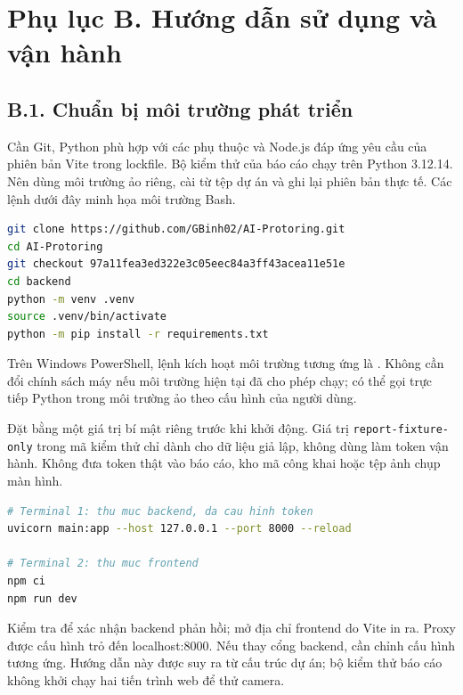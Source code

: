 \chapter*{Phụ lục B. Hướng dẫn sử dụng và vận hành}
\setcounter{table}{0}
\renewcommand{\theHtable}{appendixB.\arabic{table}}
\setcounter{lstlisting}{0}
\section*{B.1. Chuẩn bị môi trường phát triển}
Cần Git, Python phù hợp với các phụ thuộc và Node.js đáp ứng yêu cầu của phiên bản Vite trong lockfile. Bộ kiểm thử của báo cáo chạy trên Python 3.12.14. Nên dùng môi trường ảo riêng, cài từ tệp dự án và ghi lại phiên bản thực tế. Các lệnh dưới đây minh họa môi trường Bash.

\begin{lstlisting}[language=bash,caption={Lấy đúng phiên bản mã khảo sát}]
git clone https://github.com/GBinh02/AI-Protoring.git
cd AI-Protoring
git checkout 97a11fea3ed322e3c05eec84a3ff43acea11e51e
cd backend
python -m venv .venv
source .venv/bin/activate
python -m pip install -r requirements.txt
\end{lstlisting}
Trên Windows PowerShell, lệnh kích hoạt môi trường tương ứng là . Không cần đổi chính sách máy nếu môi trường hiện tại đã cho phép chạy; có thể gọi trực tiếp Python trong môi trường ảo theo cấu hình của người dùng.

Đặt  bằng một giá trị bí mật riêng trước khi khởi động. Giá trị \texttt{report-fixture-only} trong mã kiểm thử chỉ dành cho dữ liệu giả lập, không dùng làm token vận hành. Không đưa token thật vào báo cáo, kho mã công khai hoặc tệp ảnh chụp màn hình.

\begin{lstlisting}[language=bash,caption={Chạy backend và frontend trong hai terminal}]
# Terminal 1: thu muc backend, da cau hinh token
uvicorn main:app --host 127.0.0.1 --port 8000 --reload

# Terminal 2: thu muc frontend
npm ci
npm run dev
\end{lstlisting}
Kiểm tra  để xác nhận backend phản hồi; mở địa chỉ frontend do Vite in ra. Proxy  được cấu hình trỏ đến localhost:8000. Nếu thay cổng backend, cần chỉnh cấu hình tương ứng. Hướng dẫn này được suy ra từ cấu trúc dự án; bộ kiểm thử báo cáo không khởi chạy hai tiến trình web để thử camera.

